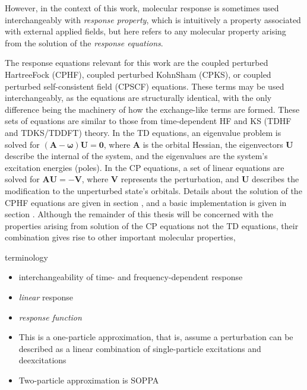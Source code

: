 \documentclass[%
class = book,%
crop = false,%
float = true,%
multi = true,%
preview = false,%
]{standalone}
\newcommand\hf{Hartree\textendash{}Fock}
\begin{document}
However, in the context of this work, molecular response is sometimes used interchangeably with \emph{response property}, which is intuitively a property associated with external applied fields, but here refers to any molecular property arising from the solution of the \emph{response equations}.

The response equations relevant for this work are the coupled perturbed \hf{} (CPHF), coupled perturbed Kohn\textendash{}Sham (CPKS), or coupled perturbed self-consistent field (CPSCF) equations. These terms may be used interchangeably, as the equations are structurally identical, with the only difference being the machinery of how the exchange-like terms are formed. These sets of equations are similar to those from time-dependent HF and KS (TDHF and TDKS/TDDFT) theory. In the TD equations, an eigenvalue problem is solved for \((\mathbf{A} - \mathbf{\omega})\mathbf{U} = \mathbf{0}\), where \(\mathbf{A}\) is the orbital Hessian, the eigenvectors \(\mathbf{U}\) describe the internal  of the system, and the eigenvalues are the system's excitation energies (poles). In the CP equations, a set of linear equations are solved for \(\mathbf{AU} = -\mathbf{V}\), where \(\mathbf{V}\) represents the perturbation, and \(\mathbf{U}\) describes the modification to the unperturbed state's orbitals. Details about the solution of the CPHF equations are given in section , and a basic implementation is given in section . Although the remainder of this thesis will be concerned with the properties arising from solution of the CP equations not the TD equations, their combination gives rise to other important molecular properties, 

\begin{anfxnote}{terminology}
  \begin{itemize}
  \item interchangeability of time- and frequency-dependent response
  \item \emph{linear} response
  \item \emph{response function}
  \item This is a one-particle approximation, that is, assume a perturbation can be described as a linear combination of single-particle excitations and deexcitations
  \item Two-particle approximation is SOPPA
  \end{itemize}
\end{anfxnote}
\end{document}
